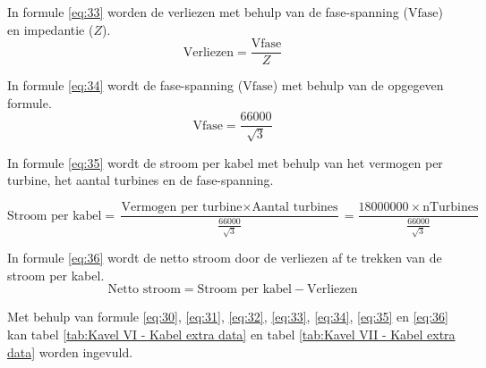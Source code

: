 In formule \ref{eq:33} worden de verliezen met behulp van de fase-spanning (\(\text{{Vfase}}\)) en impedantie (\(Z\)).
\begin{equation} \label{eq:33}
\text{{Verliezen}} = \frac{{\text{{Vfase}}}}{{Z}}
\end{equation}


In formule \ref{eq:34} wordt de fase-spanning (\(\text{{Vfase}}\)) met behulp van de opgegeven formule.
\begin{equation} \label{eq:34}
\text{{Vfase}} = \frac{{66000}}{{\sqrt{3}}}
\end{equation}


In formule \ref{eq:35} wordt de stroom per kabel met behulp van het vermogen per turbine, het aantal turbines en de fase-spanning.

\begin{equation} \label{eq:35}
\text{{Stroom per kabel}} = \frac{{\text{{Vermogen per turbine}} \times \text{{Aantal turbines}}}}{{\frac{{66000}}{{\sqrt{3}}}}} = \frac{{18000000 \times \text{{nTurbines}}}}{{\frac{{66000}}{{\sqrt{3}}}}}
\end{equation}

In formule \ref{eq:36} wordt de netto stroom door de verliezen af te trekken van de stroom per kabel.
\begin{equation} \label{eq:36}
\text{{Netto stroom}} = \text{{Stroom per kabel}} - \text{{Verliezen}}
\end{equation}


Met behulp van formule \ref{eq:30}, \ref{eq:31}, \ref{eq:32}, \ref{eq:33}, \ref{eq:34}, \ref{eq:35} en \ref{eq:36} kan tabel \ref{tab:Kavel VI - Kabel extra data} en tabel \ref{tab:Kavel VII - Kabel extra data} worden ingevuld.

